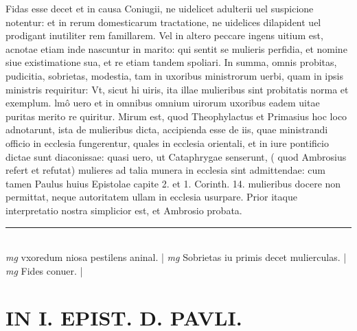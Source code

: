 \documentclass{article}
\begin{document}
\begin{pages}
Fidas esse decet et in causa Coniugii, ne uidelicet adulterii uel suspicione notentur: et in rerum domesticarum tractatione, ne uidelices dilapident uel prodigant inutiliter rem famillarem. Vel in altero peccare ingens uitium est, acnotae etiam inde nascuntur in marito: qui sentit se mulieris perfidia, et nomine siue existimatione sua, et re etiam tandem spoliari. In summa, omnis probitas, pudicitia, sobrietas, modestia, tam in uxoribus ministrorum uerbi, quam in ipsis ministris requiritur: Vt, sicut hi uiris, ita illae mulieribus sint probitatis norma et exemplum. lmô uero et in omnibus omnium uirorum uxoribus eadem uitae puritas merito re quiritur. Mirum est, quod Theophylactus et Primasius hoc loco adnotarunt, ista de mulieribus dicta, accipienda esse de iis, quae ministrandi officio in ecclesia fungerentur, quales in ecclesia orientali, et in iure pontificio dictae sunt diaconissae: quasi uero, ut Cataphrygae senserunt, ( quod Ambrosius refert et refutat) mulieres ad talia munera in ecclesia sint admittendae: cum tamen Paulus huius Epistolae capite 2. et 1. Corinth. 14. mulieribus docere non permittat, neque autoritatem ullam in ecclesia usurpare. Prior itaque interpretatio nostra simplicior est, et Ambrosio probata.  \pend
\vspace{0.5cm}\noindent
\vspace{0.2cm}\rule{1cm}{0.2pt}\\ 
\hspace{0.2cm}\textit{mg}
\footnotesize vxoredum niosa pestilens aninal. 
\normalsize| 
\hspace{0.2cm}\textit{mg}
\footnotesize Sobrietas iu primis decet mulierculas. 
\normalsize| 
\hspace{0.2cm}\textit{mg}
\footnotesize Fides conuer. 
\normalsize| 
\section*{IN I. EPIST. D. PAVLI. }
\marginpar{[ p.86 ]}
{}

\end{pages}
\end{document}
